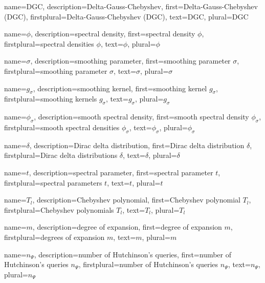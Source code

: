 %
{%
  name={DGC},%
  description={Delta-Gauss-Chebyshev},%
  first={Delta-Gauss-Chebyshev (DGC)},%
  firstplural={Delta-Gauss-Chebyshev (DGC)},%
  text={DGC},%
  plural={DGC}%
}

{%
  name={$\phi$},%
  description={spectral density},%
  first={spectral density $\phi$},%
  firstplural={spectral densities $\phi$},%
  text={$\phi$},%
  plural={$\phi$}%
}

{%
  name={$\sigma$},%
  description={smoothing parameter},%
  first={smoothing parameter $\sigma$},%
  firstplural={smoothing parameter $\sigma$},%
  text={$\sigma$},%
  plural={$\sigma$}%
}

{%
  name={$g_{\sigma}$},%
  description={smoothing kernel},%
  first={smoothing kernel $g_{\sigma}$},%
  firstplural={smoothing kernels $g_{\sigma}$},%
  text={$g_{\sigma}$},%
  plural={$g_{\sigma}$}%
}

{%
  name={$\phi_{\sigma}$},%
  description={smooth spectral density},%
  first={smooth spectral density $\phi_{\sigma}$},%
  firstplural={smooth spectral densities $\phi_{\sigma}$},%
  text={$\phi_{\sigma}$},%
  plural={$\phi_{\sigma}$}%
}

{%
  name={$\delta$},%
  description={Dirac delta distribution},%
  first={Dirac delta distribution $\delta$},%
  firstplural={Dirac delta distributions $\delta$},%
  text={$\delta$},%
  plural={$\delta$}%
}

%
{%
  name={$t$},%
  description={spectral parameter},%
  first={spectral parameter $t$},%
  firstplural={spectral parameters $t$},%
  text={$t$},%
  plural={$t$}%
}

{%
  name={$T_l$},%
  description={Chebyshev polynomial},%
  first={Chebyshev polynomial $T_l$},%
  firstplural={Chebyshev polynomials $T_l$},%
  text={$T_l$},%
  plural={$T_l$}%
}

{%
  name={$m$},%
  description={degree of expansion},%
  first={degree of expansion $m$},%
  firstplural={degrees of expansion $m$},%
  text={$m$},%
  plural={$m$}%
}

{%
  name={$n_{\Psi}$},%
  description={number of Hutchinson's queries},%
  first={number of Hutchinson's queries $n_{\Psi}$},%
  firstplural={number of Hutchinson's queries $n_{\Psi}$},%
  text={$n_{\Psi}$},%
  plural={$n_{\Psi}$}%
}

